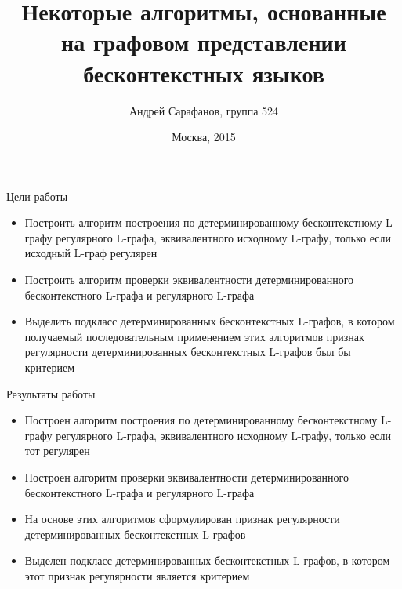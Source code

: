 \documentclass{beamer}
\title {Некоторые алгоритмы, основанные на графовом представлении бесконтекстных языков}
\author {Андрей Сарафанов, группа 524}
\institute {\small{
  Факультет вычислительной математики и кибернетики\\
  МГУ им. Ломоносова
}}
\date {\footnotesize{Москва, 2015}}
\begin{document}
\begin{frame}
  \titlepage
\end{frame}

\begin{frame} {Цели работы}
\begin{itemize}
  \item Построить алгоритм построения по детерминированному бесконтекстному L-графу регулярного L-графа, эквивалентного исходному L-графу, только если исходный L-граф регулярен
  \item Построить алгоритм проверки эквивалентности детерминированного бесконтекстного L-графа и регулярного L-графа
  \item Выделить подкласс детерминированных бесконтекстных L-графов, в котором получаемый последовательным применением этих алгоритмов признак регулярности детерминированных бесконтекстных L-графов был бы критерием
\end{itemize}
\end{frame}

\begin{frame} {Результаты работы}
\begin{itemize}
  \item Построен алгоритм построения по детерминированному бесконтекстному L-графу регулярного L-графа, эквивалентного исходному  L-графу, только если тот регулярен
  \item Построен алгоритм проверки эквивалентности детерминированного бесконтекстного L-графа и регулярного L-графа
  \item На основе этих алгоритмов сформулирован признак регулярности детерминированных бесконтекстных L-графов
  \item Выделен подкласс детерминированных бесконтекстных L-графов, в котором этот признак регулярности является критерием
\end{itemize}
\end{frame}
\end{document}
